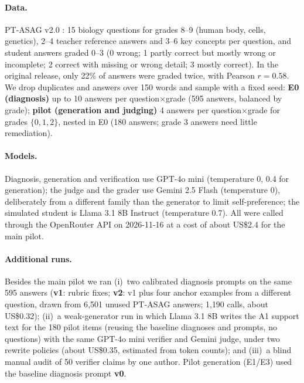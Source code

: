 \documentclass[11pt]{article}
\begin{document}
\paragraph{Data.} PT-ASAG v2.0 \citep{galhardi2018}: 15 biology questions for grades 8--9 (human body, cells, genetics), 2--4 teacher reference answers and 3--6 key concepts per question, and student answers graded 0--3 (0 wrong; 1 partly correct but mostly wrong or incomplete; 2 correct with missing or wrong detail; 3 mostly correct). In the original release, only 22\% of answers were graded twice, with Pearson $r{=}0.58$. We drop duplicates and answers over 150 words and sample with a fixed seed: \textbf{E0 (diagnosis)} up to 10 answers per question$\times$grade (595 answers, balanced by grade); \textbf{pilot (generation and judging)} 4 answers per question$\times$grade for grades $\{0,1,2\}$, nested in E0 (180 answers; grade 3 answers need little remediation).

\paragraph{Models.} Diagnosis, generation and verification use GPT-4o mini \citep{openai2024mini} (temperature 0, 0.4 for generation); the judge and the grader use Gemini 2.5 Flash \citep{gemini25} (temperature 0), deliberately from a different family than the generator to limit self-preference; the simulated student is Llama 3.1 8B Instruct \citep{llama3} (temperature 0.7). All were called through the OpenRouter API on 2026-11-16 at a cost of about US\$2.4 for the main pilot.

\paragraph{Additional runs.} Besides the main pilot we ran (i)~two calibrated diagnosis prompts on the same 595 answers (\textbf{v1}: rubric fixes; \textbf{v2}: v1 plus four anchor examples from a different question, drawn from 6{,}501 unused PT-ASAG answers; 1{,}190 calls, about US\$0.32); (ii)~a weak-generator run in which Llama 3.1 8B writes the A1 support text for the 180 pilot items (reusing the baseline diagnoses and prompts, no questions) with the same GPT-4o mini verifier and Gemini judge, under two rewrite policies (about US\$0.35, estimated from token counts); and (iii)~a blind manual audit of 50 verifier claims by one author. Pilot generation (E1/E3) used the baseline diagnosis prompt \textbf{v0}.
\end{document}
